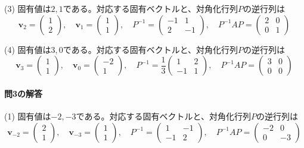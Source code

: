 (3) 固有値は$2, 1$である。対応する固有ベクトルと、対角化行列$P$の逆行列は
\[
\bm{v}_2 = 
\begin{pmatrix}
1 \\
2
\end{pmatrix}, \quad
\bm{v}_{1} = 
\begin{pmatrix}
1 \\
1
\end{pmatrix}, \quad
P^{-1} = 
\begin{pmatrix}
-1 & 1 \\
2 & -1
\end{pmatrix}, \quad
P^{-1} AP =
\begin{pmatrix}
2 & 0 \\
0 & 1
\end{pmatrix}
\]

(4) 固有値は$3, 0$である。対応する固有ベクトルと、対角化行列$P$の逆行列は
\[
\bm{v}_3 = 
\begin{pmatrix}
1 \\
1
\end{pmatrix}, \quad
\bm{v}_0 = 
\begin{pmatrix}
-2 \\
1
\end{pmatrix}, \quad
P^{-1} = 
\frac{1}{3}
\begin{pmatrix}
1 & 2 \\
-1 & 1
\end{pmatrix}, \quad
P^{-1} AP =
\begin{pmatrix}
3 & 0 \\
0 & 0
\end{pmatrix}
\]

\paragraph{問3の解答}

(1) 固有値は$-2, -3$である。対応する固有ベクトルと、対角化行列$P$の逆行列は
\[
\bm{v}_{-2} = 
\begin{pmatrix}
2 \\
1
\end{pmatrix}, \quad
\bm{v}_{-3} = 
\begin{pmatrix}
1 \\
1
\end{pmatrix}, \quad
P^{-1} = 
\begin{pmatrix}
1 & -1 \\
-1 & 2
\end{pmatrix}, \quad
P^{-1} AP =
\begin{pmatrix}
-2 & 0 \\
0 & -3
\end{pmatrix}
\]

